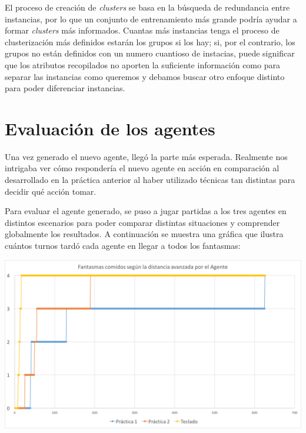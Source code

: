 \documentclass[12pt]{article}
\begin{document}
El proceso de creación de \textit{clusters} se basa en la búsqueda de redundancia entre instancias, por lo que un conjunto de entrenamiento más grande podría ayudar a formar \textit{clusters} más informados. Cuantas más instancias tenga el proceso de clusterización más definidos estarán los grupos si los hay; si, por el contrario, los grupos no están definidos con un numero cuantioso de instacias, puede significar que los atributos recopilados no aporten la suficiente información como para separar las instancias como queremos y debamos buscar otro enfoque distinto para poder diferenciar instancias.

\newpage
\section{Evaluación de los agentes}


Una vez generado el nuevo agente, llegó la parte más esperada. Realmente nos intrigaba ver cómo respondería el nuevo agente en acción en comparación al desarrollado en la práctica anterior al haber utilizado técnicas tan distintas para decidir qué acción tomar.


Para evaluar el agente generado, se puso a jugar partidas a los tres agentes en distintos escenarios para poder comparar distintas situaciones y comprender globalmente los resultados. A continuación se muestra una gráfica que ilustra cuántos turnos tardó cada agente en llegar a todos los fantasmas:

\begin{center}
    \includegraphics[width=15cm]{classicPerformanceComparison}
\end{center}
\end{document}
